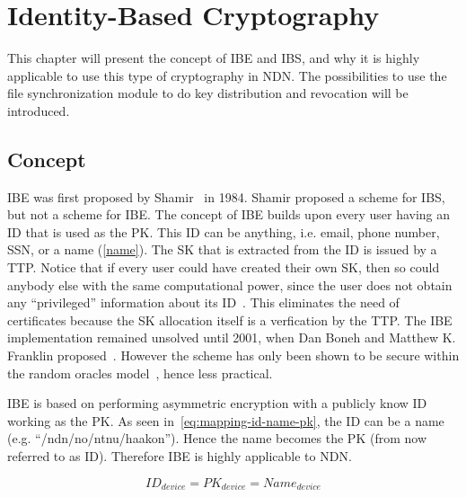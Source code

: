\chapter{Identity-Based Cryptography}\label{chp:ibc}
This chapter will present the concept of \gls{IBE} and \gls{IBS}, and why it is highly applicable to use this type of cryptography in \gls{NDN}. 
The possibilities to use the file synchronization module to do key distribution and revocation will be introduced.

\section{Concept}\label{ibc}
\gls{IBE} was first proposed by Shamir~\cite{DBLP:conf/crypto/Shamir84} in 1984. 
Shamir proposed a scheme for \gls{IBS}, but not a scheme for \gls{IBE}. 
The concept of \gls{IBE} builds upon every user having an \gls{ID} that is used as the \gls{PK}. 
This \gls{ID} can be anything, i.e. email, phone number, \gls{SSN}, or a \gls{name} (\autoref{name}).
The \gls{SK} that is extracted from the \gls{ID} is issued by a \gls{TTP}.
Notice that if every user could have created their own \gls{SK}, then so could anybody else with the same computational power, since the user does not obtain any ``privileged'' information about its \gls{ID}~\cite{Bidgoli06}.
This eliminates the need of certificates because the \gls{SK} allocation itself is a verfication by the \gls{TTP}.
The \gls{IBE} implementation remained unsolved until 2001, when Dan Boneh and Matthew K. Franklin proposed~\cite{DBLP:conf/crypto/BonehF01}.
However the scheme has only been shown to be secure within the random oracles model~\cite{DBLP:journals/iacr/Waters04}, hence less practical.

\gls{IBE} is based on performing asymmetric encryption with a publicly know \gls{ID} working as the \gls{PK}.
As seen in~\autoref{eq:mapping-id-name-pk}, the \gls{ID} can be a \gls{name} (e.g. ``/ndn/no/ntnu/haakon'').
Hence the \gls{name} becomes the \gls{PK} (from now referred to as \gls{ID}).
Therefore \gls{IBE} is highly applicable to \gls{NDN}.

\begin{equation}\label{eq:mapping-id-name-pk}
ID_{device} = PK_{device} = Name_{device}
\end{equation}

